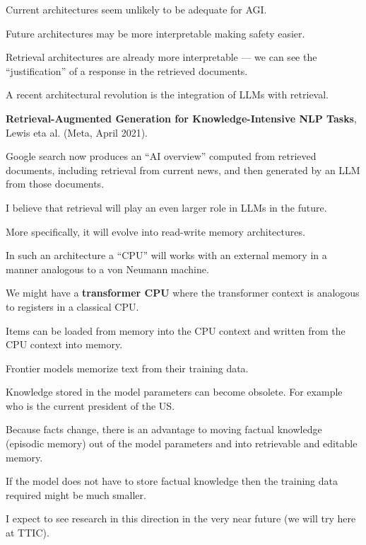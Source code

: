 {

Current architectures seem unlikely to be adequate for AGI.

\vfill
Future architectures may be more interpretable making safety easier.

\vfill
Retrieval architectures are already more interpretable --- we can see the ``justification'' of a response in the retrieved documents.


A recent architectural revolution is the integration of LLMs with retrieval.

\vfill
{\bf Retrieval-Augmented Generation for Knowledge-Intensive NLP Tasks}, Lewis eta al. (Meta, April 2021).

\vfill
Google search now produces an ``AI overview'' computed from retrieved documents, including retrieval from current news,
and then generated by an LLM from those documents.


I believe that retrieval will play an even larger role in LLMs in the future.

\vfill
More specifically, it will evolve into read-write memory architectures.

\vfill
In such an architecture a ``CPU'' will works with an external memory in a manner analogous to a von Neumann machine.

\vfill
We might have a {\bf transformer CPU} where the transformer context is analogous to registers in a classical CPU.

\vfill
Items can be loaded from memory into the CPU context and written from the CPU context into memory.


Frontier models memorize text from their training data.

\vfill
Knowledge stored in the model parameters can become obsolete.  For example who is the current president of the US.

\vfill
Because facts change, there is an advantage to moving factual knowledge (episodic memory) out of the model parameters
and into retrievable and editable memory.

\vfill
If the model does not have to store factual knowledge then the training data required might be much smaller.

\vfill
I expect to see research in this direction in the very near future (we will try here at TTIC).

}
